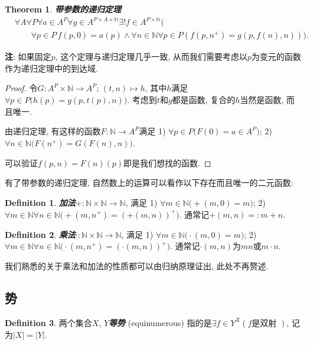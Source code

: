 \documentclass[UTF8,AutoFakeBold]{ctexart}
\theoremstyle{plain}
\newtheorem{theorem}{Theorem}[section] %
\theoremstyle{definition}
\newtheorem{definition}{Definition}[section] %
\newcommand*{\indexbf}[1]{\textit{\textbf{#1}}\index{#1}}
\begin{document}
\begin{theorem} \indexbf{带参数的递归定理}
\begin{align*}
&
	\forall A\forall P\forall a\in A^P
	\forall g \in A^{P\times A\times \mathbb N}
	\exists ! f\in A^{P\times \mathbb N}\big(
\\ &\qquad
		\forall p\in P\,f(p,0)=a(p) \wedge \forall n\in \mathbb N\forall p\in P(
			f(p,n^+) = g(p,f(n),n))\big).
\end{align*}

\end{theorem}
\textbf{注}: 如果固定$p$, 这个定理与递归定理几乎一致, 从而我们需要考虑以$p$为变元的函数作为递归定理中的到达域.
\begin{proof}
令$G\colon A^P\times \mathbb N \to A^P$; $(t,n) \mapsto h$, 其中$h$满足$\forall p\in P \big(
	h(p) = g(p,t(p),n)\big)$. 
考虑到$t$和$g$都是函数, 复合的$h$当然是函数, 而且唯一.

由递归定理, 有这样的函数$F \colon \mathbb N \to A^P$满足 
1) $\forall p\in P\big(
	F(0)=a\in A^P\big)$; 
2) $\forall n\in \mathbb N\big(
	F(n^+) = G(F(n), n)\big)$. 

可以验证$f(p,n) = F(n)(p)$即是我们想找的函数.
\end{proof}

有了带参数的递归定理, 自然数上的运算可以看作以下存在而且唯一的二元函数:

\begin{definition}
\indexbf{加法}$+\colon \mathbb N\times \mathbb N \to \mathbb N$, 满足
1) $\forall m\in \mathbb N \big( 
	+(m,0)=m\big)$;
2) $\forall m\in\mathbb N\forall n\in \mathbb N \big(
	+(m,n^+)=(+(m,n))^+\big)$. 通常记$+(m,n) =: m+n$.
\end{definition}

\begin{definition}
\indexbf{乘法}$\cdot \colon \mathbb N\times \mathbb N \to \mathbb N$, 满足
1) $\forall m\in \mathbb N \big( 
	\cdot(m,0)=m\big)$;
2) $\forall m\in\mathbb N\forall n\in \mathbb N \big(
	\cdot(m,n^+)=(\cdot(m,n))^+\big)$. 通常记$\cdot(m,n) $为$mn$或$m\cdot n$.
\end{definition}

我们熟悉的关于乘法和加法的性质都可以由归纳原理证出, 此处不再赘述.

\subsection{势}

\begin{definition}\label{equinumerosity}
两个集合$X$, $Y$\indexbf{等势} (equinumerous) 指的是$\exists f \in Y^X (f\text{是双射 })$, 记为$|X|=|Y|$.
\end{definition}
\end{document}
